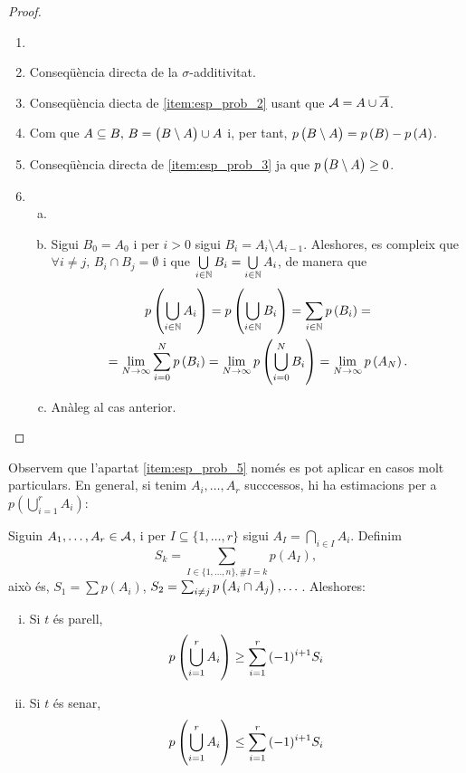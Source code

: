 \begin{proof}
    \begin{enumerate}
        \item[]
        \item Conseqüència directa de la $\sigma$-additivitat.
        \item Conseqüència diecta de \ref{item:esp_prob_2} usant que $\mathcal{A} = A\cup \overline{A}$.
        \item Com que $A\subseteq B,\, B=\left( B\setminus A\right) \cup A$ i, per tant, $p\left( B\setminus A \right) = p\left( B\right) - p\left( A\right)$.
        \item Conseqüència directa de \ref{item:esp_prob_3} ja que $p\left( B\setminus A\right)\geq 0$.
        \item 
        \begin{enumerate}[a)]
            \item[]
            \item Sigui $B_0=A_0$ i per $i>0$ sigui $B_i = A_i\setminus A_{i-1}$. Aleshores, es compleix que $\forall i\neq j, \, B_i \cap B_j =\emptyset$ i que $\bigcup\limits_{i\in \mathbb{N}} B_i = \bigcup\limits_{i\in\mathbb{N}} A_i$, de manera que
            \begin{gather*}
                p\left(\bigcup\limits_{i\in\mathbb{N}} A_i\right) = p\left(\bigcup\limits_{i\in\mathbb{N}} B_i\right) = \sum\limits_{i\in\mathbb{N}} p\left( B_i\right) =\\
                = \lim\limits_{N\to\infty} \sum_{i=0}^N p\left( B_i\right) = \lim\limits_{N\to\infty} p\left( \bigcup_{i=0}^N B_i\right) = \lim\limits_{N\to\infty} p\left( A_N\right).
            \end{gather*}
            \item Anàleg al cas anterior.
        \end{enumerate}
    \end{enumerate}
\end{proof}

Observem que l'apartat \ref{item:esp_prob_5} només es pot aplicar en casos molt particulars. En general, si tenim $A_i,\dots,A_r$ succcessos,
hi ha estimacions per a $p(\bigcup_{i=1}^{r}{A_i})$:

\begin{teo}
    Siguin $A_1,\dots,A_r\in\mathcal{A}$, i per $I\subseteq\{1,\dots,r\}$ sigui $A_I = \bigcap\limits_{i \in I}{A_i}$. Definim
    \[
        S_k = \sum_{I \in \{1,\dots,n\},\#I=k}{p(A_I)},
    \]
    això és, $S_1 = \sum{p(A_i)}$, $S_2 = \sum_{i \neq j}p\left( A_i \cap A_j\right),\dots$. Aleshores:
    \begin{enumerate}[i)]
         \item Si $t$ és parell,
            \[p\left(\bigcup_{i=1}^{r}{A_i}\right) \geq \sum_{i=1}^{r}{(-1)^{i+1}S_i}\]
         \item Si $t$ és senar,
            \[p\left(\bigcup_{i=1}^{r}{A_i}\right) \leq \sum_{i=1}^{r}{(-1)^{i+1}S_i}\]
    \end{enumerate}
\end{teo}

